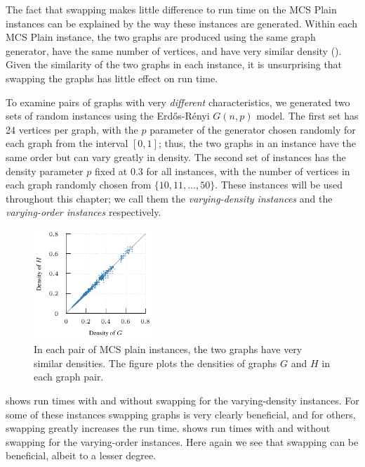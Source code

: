 The fact that swapping makes little difference to run time on the MCS Plain
instances can be explained by the way these instances are generated.  Within
each MCS Plain instance, the two graphs are produced using the same graph
generator, have the same number of vertices, and have very similar density
().  Given the similarity of the two graphs in
each instance, it is unsurprising that swapping the graphs has little
effect on run time.

To examine pairs of graphs with very \emph{different} characteristics, we
generated two sets of random instances using the Erd\H{o}s-Rényi $G(n,p)$ model.
The first set has 24 vertices per graph, with the $p$ parameter of the
generator chosen randomly for each graph from the interval $[0,1]$; thus, the
two graphs in an instance have the
same order but can vary greatly in density.  The second set of instances has the
density parameter $p$ fixed at $0.3$ for all instances, with the number of
vertices in each graph randomly chosen from $\{10, 11, \dots, 50\}$.  These
instances will be used throughout this chapter; we call them the
\emph{varying-density instances} and the \emph{varying-order instances}
respectively.

\begin{figure}[htb]
    \centering
    \includegraphics*[width=0.4\textwidth]{14-mcsplit-i-undirected/modified-mcsplit-experiment/plots/plots/mcsplain-densities}
    \caption{In each pair of MCS plain instances, the two graphs have very similar densities. The figure
        plots the densities of graphs $G$ and $H$ in each graph pair.}
    \label{figure:mcsplain-densities}
\end{figure}

 shows run times with and without swapping
for the varying-density instances.
For some of these instances swapping graphs is very clearly beneficial, and for others,
swapping greatly increases the run time.
 shows run times with and without swapping
for the varying-order instances.  Here again we see that swapping can be beneficial,
albeit to a lesser degree.

